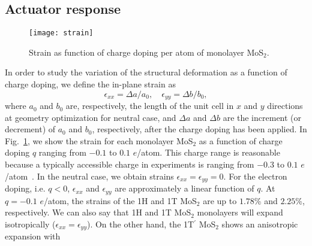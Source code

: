 \documentclass[12pt]{iopart}
\begin{document}
\subsection{Actuator response}

\begin{figure}[t!]
  \centering \texttt{[image: strain]}
  \caption{\label{fig:energy-strain}Strain as function of charge doping per
    atom of monolayer MoS$_2$.}
\end{figure}

In order to study the variation of the structural deformation as a
function of charge doping, we define the in-plane strain as
\begin{equation}
\label{eq:strain}
  \epsilon_{xx}=\Delta a/a_0, \quad \epsilon_{yy}=\Delta b/b_0,
\end{equation}
where $a_0$ and $b_0$ are, respectively, the length of the unit cell
in $x$ and $y$ directions at geometry optimization for neutral case,
and $\Delta a$ and $\Delta b$ are the increment (or decrement) of
$a_0$ and $b_0$, respectively, after the charge doping has been
applied. In Fig.~\ref{fig:energy-strain}, we show the strain for each
monolayer MoS$_2$ as a function of charge doping $q$ ranging from
$-0.1$ to $0.1$ $e$/atom.  This charge range is reasonable because a
typically accessible charge in experiments is ranging from $-0.3$ to
$0.1$ $e$/atom~\cite{sun2002dimensional}.  In the neutral case, we
obtain strains $\epsilon_{xx}=\epsilon_{yy}=0$.  For the electron
doping, i.e. $q<0$, $\epsilon_{xx}$ and $\epsilon_{yy}$ are
approximately a linear function of $q$.  At $q=-0.1$ $e$/atom, the
strains of the 1H and 1T MoS$_2$ are up to $1.78$\% and $2.25$\%,
respectively.  We can also say that 1H and 1T MoS$_2$ monolayers will
expand isotropically ($\epsilon_{xx} = \epsilon_{yy}$).  On the other
hand, the 1T$^\prime$ MoS$_2$ shows an anisotropic expansion with
\end{document}
